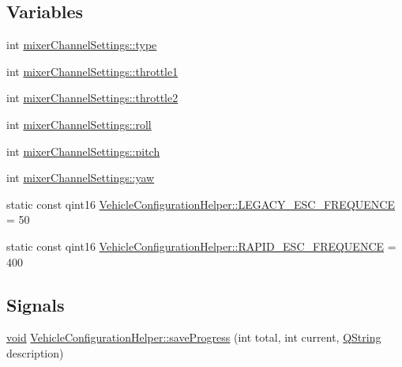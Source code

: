 \subsection*{\-Variables}
\begin{DoxyCompactItemize}
\item 
int \hyperlink{group___vehicle_configuration_helper_gae266726733ea9753d4b40ababc4ed7dd}{mixer\-Channel\-Settings\-::type}
\item 
int \hyperlink{group___vehicle_configuration_helper_ga938151d1ab96457978b7689a772b1d2f}{mixer\-Channel\-Settings\-::throttle1}
\item 
int \hyperlink{group___vehicle_configuration_helper_gaaa198e94e22ad3c7474bef8972c5e73d}{mixer\-Channel\-Settings\-::throttle2}
\item 
int \hyperlink{group___vehicle_configuration_helper_ga41061bf67fafdf170291f3a518268645}{mixer\-Channel\-Settings\-::roll}
\item 
int \hyperlink{group___vehicle_configuration_helper_gac604b2322be856866e658f6fba34c7f7}{mixer\-Channel\-Settings\-::pitch}
\item 
int \hyperlink{group___vehicle_configuration_helper_ga16a724da7162ceb2c56798d864dac807}{mixer\-Channel\-Settings\-::yaw}
\item 
static const qint16 \hyperlink{group___vehicle_configuration_helper_ga1ab33357e7669d7825cadb88ff666f98}{\-Vehicle\-Configuration\-Helper\-::\-L\-E\-G\-A\-C\-Y\-\_\-\-E\-S\-C\-\_\-\-F\-R\-E\-Q\-U\-E\-N\-C\-E} = 50
\item 
static const qint16 \hyperlink{group___vehicle_configuration_helper_ga5bdfa86a19f74eae8f6b44ac63d640f2}{\-Vehicle\-Configuration\-Helper\-::\-R\-A\-P\-I\-D\-\_\-\-E\-S\-C\-\_\-\-F\-R\-E\-Q\-U\-E\-N\-C\-E} = 400
\end{DoxyCompactItemize}
\subsection*{\-Signals}
\begin{DoxyCompactItemize}
\item 
\hyperlink{group___u_a_v_objects_plugin_ga444cf2ff3f0ecbe028adce838d373f5c}{void} \hyperlink{group___vehicle_configuration_helper_ga7ec52f13c4dee3a474698106c2ca3bf4}{\-Vehicle\-Configuration\-Helper\-::save\-Progress} (int total, int current, \hyperlink{group___u_a_v_objects_plugin_gab9d252f49c333c94a72f97ce3105a32d}{\-Q\-String} description)
\end{DoxyCompactItemize}


